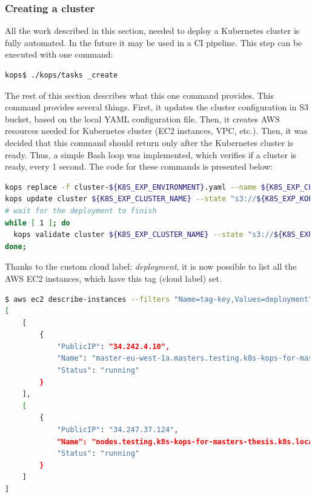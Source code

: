 \subsubsection{Creating a cluster}
\label{kops-creating-the-cluster}
All the work described in this section, needed to deploy a Kubernetes cluster is fully automated. In the future it may be used in a CI pipeline. This step can be executed with one command:
\begin{lstlisting}[basicstyle=\tiny,caption={TODO},captionpos=b,language=Bash,xleftmargin=1cm]
kops$ ./kops/tasks _create
\end{lstlisting}

The rest of this section describes what this one command provides. This command provides several things. First, it updates the cluster configuration in S3 bucket, based on the local YAML configuration file. Then, it creates AWS resources needed for Kubernetes cluster (EC2 instances, VPC, etc.). Then, it was decided that this command should return only after the Kubernetes cluster is ready. Thus, a simple Bash loop was implemented, which verifies if a cluster is ready, every 1 second. The code for these commands is presented below:
\begin{lstlisting}[basicstyle=\tiny,caption={TODO},captionpos=b,language=Bash,xleftmargin=1cm]
kops replace -f cluster-${K8S_EXP_ENVIRONMENT}.yaml --name ${K8S_EXP_CLUSTER_NAME} --state "s3://${K8S_EXP_KOPS_S3_BUCKET}"
kops update cluster ${K8S_EXP_CLUSTER_NAME} --state "s3://${K8S_EXP_KOPS_S3_BUCKET}" --yes
# wait for the deployment to finish
while [ 1 ]; do
  kops validate cluster ${K8S_EXP_CLUSTER_NAME} --state "s3://${K8S_EXP_KOPS_S3_BUCKET}" && break || sleep 30
done;
\end{lstlisting}

Thanks to the custom cloud label: \textit{deployment}, it is now possible to list all the AWS EC2 instances, which have this tag (cloud label) set.
\begin{lstlisting}[basicstyle=\tiny,caption={TODO},captionpos=b,language=Bash,xleftmargin=1cm]
$ aws ec2 describe-instances --filters "Name=tag-key,Values=deployment" --query "Reservations[*].Instances[*].{PublicIP:PublicIpAddress,Name:Tags[?Key=='Name']|[0].Value,Status:State.Name}"
[
    [
        {
            "PublicIP": "34.242.4.10",
            "Name": "master-eu-west-1a.masters.testing.k8s-kops-for-masters-thesis.k8s.local",
            "Status": "running"
        }
    ],
    [
        {
            "PublicIP": "34.247.37.124",
            "Name": "nodes.testing.k8s-kops-for-masters-thesis.k8s.local",
            "Status": "running"
        }
    ]
]
\end{lstlisting}

